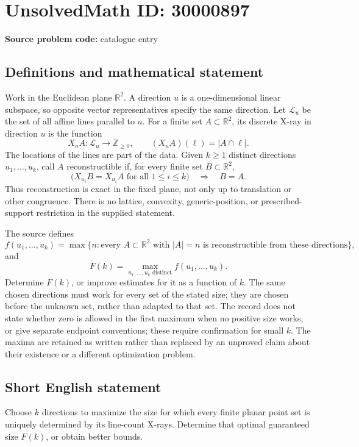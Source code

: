 \documentclass[11pt]{article}
\newcommand{\Z}{\mathbb{Z}}
\newcommand{\R}{\mathbb{R}}
\begin{document}
\section*{UnsolvedMath ID: 30000897}
\textbf{Source problem code:} catalogue entry
\subsection{Definitions and mathematical statement}
Work in the Euclidean plane \(\R^2\). A direction \(u\) is a one-dimensional linear subspace, so opposite vector representatives specify the same direction. Let \(\mathcal L_u\) be the set of all affine lines parallel to \(u\). For a finite set \(A\subset\R^2\), its discrete X-ray in direction \(u\) is the function
\[
X_uA:\mathcal L_u\to\Z_{\geq0},\qquad
(X_uA)(\ell)=|A\cap\ell|.
\]
The locations of the lines are part of the data. Given \(k\geq1\) distinct directions \(u_1,\ldots,u_k\), call \(A\) reconstructible if, for every finite set \(B\subset\R^2\),
\[
\bigl(X_{u_i}B=X_{u_i}A\text{ for all }1\leq i\leq k\bigr)
\quad\Longrightarrow\quad B=A.
\]
Thus reconstruction is exact in the fixed plane, not only up to translation or other congruence. There is no lattice, convexity, generic-position, or prescribed-support restriction in the supplied statement.

The source defines
\[
f(u_1,\ldots,u_k)=\max\{n:\text{every }A\subset\R^2\text{ with }|A|=n
\text{ is reconstructible from these directions}\},
\]
and
\[
F(k)=\max_{u_1,\ldots,u_k\text{ distinct}} f(u_1,\ldots,u_k).
\]
Determine \(F(k)\), or improve estimates for it as a function of \(k\). The same chosen directions must work for every set of the stated size; they are chosen before the unknown set, rather than adapted to that set. The record does not state whether zero is allowed in the first maximum when no positive size works, or give separate endpoint conventions; these require confirmation for small \(k\). The maxima are retained as written rather than replaced by an unproved claim about their existence or a different optimization problem.
\subsection{Short English statement}
Choose \(k\) directions to maximize the size for which every finite planar point set is uniquely determined by its line-count X-rays. Determine that optimal guaranteed size \(F(k)\), or obtain better bounds.
\end{document}
